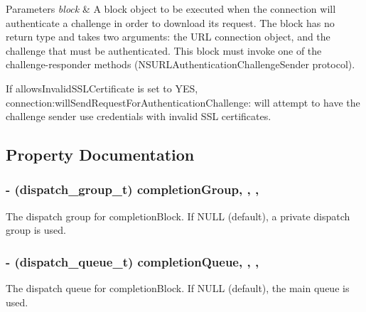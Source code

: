 \begin{DoxyParams}{Parameters}
{\em block} & A block object to be executed when the connection will authenticate a challenge in order to download its request. The block has no return type and takes two arguments\+: the U\+R\+L connection object, and the challenge that must be authenticated. This block must invoke one of the challenge-\/responder methods (N\+S\+U\+R\+L\+Authentication\+Challenge\+Sender protocol).\\
\hline
\end{DoxyParams}
If {\ttfamily allows\+Invalid\+S\+S\+L\+Certificate} is set to Y\+E\+S, {\ttfamily connection\+:will\+Send\+Request\+For\+Authentication\+Challenge\+:} will attempt to have the challenge sender use credentials with invalid S\+S\+L certificates. 

\subsection{Property Documentation}
\hypertarget{interface_a_f_u_r_l_connection_operation_aa4955286ccd61583815487d48e87dbdc}{}
\subsubsection[{completion\+Group}]{\setlength{\rightskip}{0pt plus 5cm}-\/ (dispatch\+\_\+group\+\_\+t) completion\+Group\hspace{0.3cm}{\ttfamily [read]}, {\ttfamily [write]}, {\ttfamily [nonatomic]}, {\ttfamily [assign]}}\label{interface_a_f_u_r_l_connection_operation_aa4955286ccd61583815487d48e87dbdc}
The dispatch group for {\ttfamily completion\+Block}. If {\ttfamily N\+U\+L\+L} (default), a private dispatch group is used. \hypertarget{interface_a_f_u_r_l_connection_operation_a18619e16ca125bb52c17c3ec80acccfb}{}
\subsubsection[{completion\+Queue}]{\setlength{\rightskip}{0pt plus 5cm}-\/ (dispatch\+\_\+queue\+\_\+t) completion\+Queue\hspace{0.3cm}{\ttfamily [read]}, {\ttfamily [write]}, {\ttfamily [nonatomic]}, {\ttfamily [assign]}}\label{interface_a_f_u_r_l_connection_operation_a18619e16ca125bb52c17c3ec80acccfb}
The dispatch queue for {\ttfamily completion\+Block}. If {\ttfamily N\+U\+L\+L} (default), the main queue is used. \hypertarget{interface_a_f_u_r_l_connection_operation_a3117677d8c96460f0bd1b4d3b13b6da8}{}
